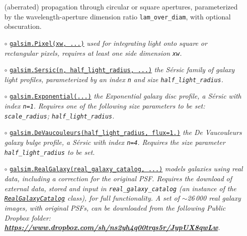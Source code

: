 \documentclass[preprint,11pt]{aastex}
\begin{document}
\begin{itemize}
{  (aberrated) propagation through circular or square apertures, parameterized by the wavelength-aperture
  dimension ratio \texttt{lam\_over\_diam}, with
  optional obscuration.}
\item[$\circ$]
  \href{http://galsim-developers.github.com/GalSim/classgalsim_1_1base_1_1_pixel.html}{\texttt{galsim.Pixel(xw,
    ...)}} \newline \emph{used for integrating light onto square or
  rectangular pixels, requires at least one side dimension \texttt{xw}.}
\item[$\circ$]
  \href{http://galsim-developers.github.com/GalSim/classgalsim_1_1base_1_1_sersic.html}{\texttt{galsim.Sersic(n,
      half\_light\_radius, ...)}} \newline\emph{ the S\'{e}rsic family of galaxy light
  profiles, parameterized by an index \texttt{n} and size \texttt{half\_light\_radius}.}
\item[$\circ$]
  \href{http://galsim-developers.github.com/GalSim/classgalsim_1_1base_1_1_exponential.html}{\texttt{galsim.Exponential(...)}}
  \newline \emph{the Exponential galaxy disc profile, a S\'{e}rsic
    with index \texttt{n=1}.  Requires one of the
    following size parameters to be set: \texttt{scale\_radius}; \texttt{half\_light\_radius}.}
\item[$\circ$]
  \href{http://galsim-developers.github.com/GalSim/classgalsim_1_1base_1_1_de_vaucouleurs.html}{\texttt{galsim.DeVaucouleurs(half\_light\_radius,
      flux=1.)}}
  \newline \emph{the De Vaucouleurs galaxy bulge profile, a S\'{e}rsic
    with index \texttt{n=4}.  Requires the size parameter
    \texttt{half\_light\_radius} to be set.}
\item[$\circ$]
  \href{http://galsim-developers.github.com/GalSim/classgalsim_1_1base_1_1_real_galaxy.html}{\texttt{galsim.RealGalaxy(real\_galaxy\_catalog,
      ...)}} \newline \emph{models galaxies using real
  data, including a correction for the original PSF.  Requires the
  download of external data, stored and input in \texttt{real\_galaxy\_catalog} (an instance of the
  \href{http://galsim-developers.github.com/GalSim/classgalsim_1_1real_1_1_real_galaxy_catalog.html}{\texttt{RealGalaxyCatalog}}
  class), for full functionality.  A set of $\sim$26\,000 real galaxy
  images, with original PSFs, can be downloaded from the following
  Public Dropbox folder: \newline
  \href{https://www.dropbox.com/sh/ns2yh4q00trqs5r/JypUX8qwLw}{{\bf https://www.dropbox.com/sh/ns2yh4q00trqs5r/JypUX8qwLw}}.}

\end{itemize}
\end{document}
